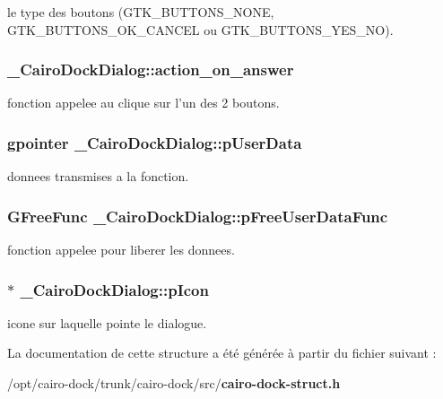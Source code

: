 le type des boutons (GTK\_\-BUTTONS\_\-NONE, GTK\_\-BUTTONS\_\-OK\_\-CANCEL ou GTK\_\-BUTTONS\_\-YES\_\-NO). 

\subsubsection{ {\bf \_\-CairoDockDialog::action\_\-on\_\-answer}}\label{struct__CairoDockDialog_2c8d6c603a6694002a2a5154d76927bd}


fonction appelee au clique sur l'un des 2 boutons. 

\subsubsection{\setlength{\rightskip}{0pt plus 5cm}gpointer {\bf \_\-CairoDockDialog::pUserData}}\label{struct__CairoDockDialog_c5ddbbfbf00a1643f29982ffebf26338}


donnees transmises a la fonction. 

\subsubsection{\setlength{\rightskip}{0pt plus 5cm}GFreeFunc {\bf \_\-CairoDockDialog::pFreeUserDataFunc}}\label{struct__CairoDockDialog_b9b704f111739b7e5b58068eb54c3462}


fonction appelee pour liberer les donnees. 

\subsubsection{$\ast$ {\bf \_\-CairoDockDialog::pIcon}}\label{struct__CairoDockDialog_30b7523044fc0946002f9e299a2fc5c9}


icone sur laquelle pointe le dialogue. 



La documentation de cette structure a été générée à partir du fichier suivant :\begin{CompactItemize}
\item 
/opt/cairo-dock/trunk/cairo-dock/src/{\bf cairo-dock-struct.h}\end{CompactItemize}
